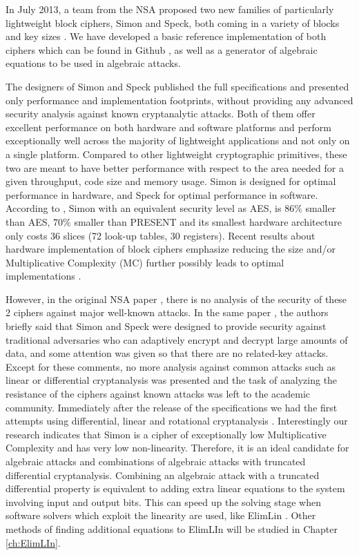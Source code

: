In July 2013, a team from the NSA proposed two new families of particularly lightweight block
ciphers, Simon and Speck, both coming in a variety of blocks and key sizes
\cite{NSAciphers}. We have developed a basic reference implementation of both ciphers 
which can be found in Github \cite{simonref},
as well as a generator of algebraic equations to be used in algebraic attacks. 

The designers of Simon and Speck published the full specifications and presented
only performance and implementation footprints, without providing
any advanced security analysis
against known cryptanalytic attacks.
Both of them offer excellent performance on both
hardware and software platforms and perform
exceptionally well across the majority of lightweight applications and
not only on a single platform. Compared to
other lightweight cryptographic primitives,
these two are meant to have better performance with respect to the area
needed for a given throughput, code size and memory usage.
Simon is designed for optimal performance in hardware, and Speck for optimal
performance in software.
According to \cite{simoneff}, Simon with an equivalent security level as AES,
is $86\%$ smaller
than AES, $70\%$ smaller than PRESENT and its smallest hardware architecture
only costs 36 slices (72 look-up tables, 30 registers). Recent results about hardware
implementation of block ciphers emphasize reducing the size and/or Multiplicative Complexity (MC) further possibly
leads to optimal implementations \cite{BoyarPeraltaMCMethodAES,OptimiPaper}.

However, in the original NSA paper \cite{NSAciphers}, there is no analysis of the security of these 2 ciphers against major well-known attacks. In the same paper \cite{NSAciphers}, the authors briefly said that Simon and Speck were designed to provide security against traditional adversaries who can adaptively encrypt and decrypt large amounts of data, and some attention was given so that there are no related-key attacks. Except for these comments, no more analysis against common attacks such as linear or differential cryptanalysis was presented and the task of analyzing the resistance of the ciphers against known attacks was left to the academic community. Immediately after the release of the specifications we had the first attempts using differential, linear and rotational cryptanalysis \cite{simon1,simon2}. Interestingly our research indicates that Simon is a cipher of exceptionally low Multiplicative Complexity \cite{TheoPhD} and has very low non-linearity. Therefore, it is an ideal candidate for algebraic attacks and combinations of algebraic attacks with truncated differential cryptanalysis. Combining an algebraic attack with a truncated differential property is equivalent to adding extra linear equations to the system involving input and output bits. This can speed up the solving stage when software solvers which exploit the linearity are used, like ElimLin \cite{ElimLinR}. Other methods of finding additional equations to ElimLIn will be studied in Chapter \ref{ch:ElimLIn}.

